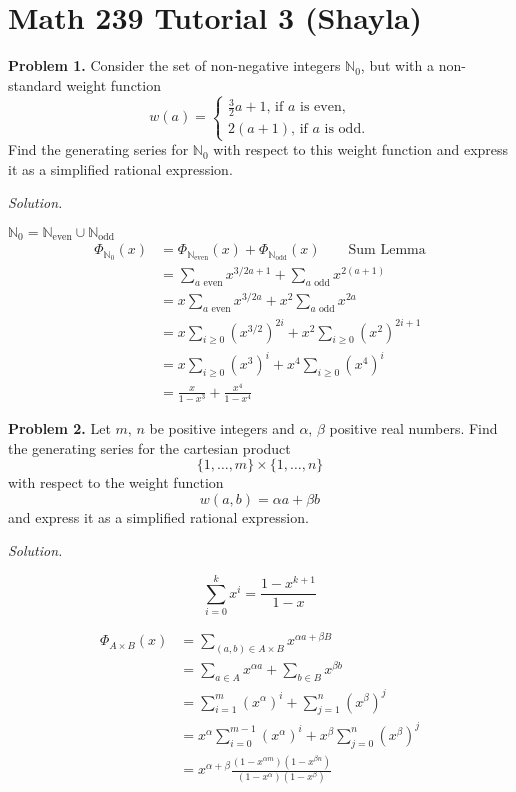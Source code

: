 \section{Math 239 Tutorial 3 (Shayla)}
\textbf{Problem 1.} Consider the set of non-negative integers
$ \mathbb{N}_0 $, but with a non-standard weight function
\[ w(a)=
\begin{cases}
    \frac{3}{2} a + 1,\,\text{if $a$ is even},\\
    2(a+1),\,\text{if $a$ is odd.}
\end{cases} \]
Find the generating series for $ \mathbb{N}_0 $ with respect to this weight
function and express it as a simplified rational expression.

\emph{Solution.}

$ \mathbb{N}_0=\mathbb{N}_{\text{even}}\cup\mathbb{N}_{\text{odd}} $
\begin{align*}
    \Phi_{\mathbb{N}_0}(x)
    &=\Phi_{\mathbb{N}_{\text{even}}}(x)+\Phi_{\mathbb{N}_{\text{odd}}}(x)\qquad\text{Sum Lemma}\\
    &=\sum\limits_{a \text{ even}}x^{3/2a+1}+\sum\limits_{a \text{ odd}}x^{2(a+1)}\\
    &=x \sum\limits_{a \text{ even}}x^{3/2a}+x^2\sum\limits_{a \text{ odd}}x^{2a}\\
    &=x \sum\limits_{i\ge 0} (x^{3/2})^{2i}+x^2\sum\limits_{i \ge 0} (x^{2})^{2i+1}\\
    &=x \sum\limits_{i\ge 0} (x^3)^i + x^4 \sum\limits_{i\ge 0} (x^4)^i\\
    &=\frac{x}{1-x^3} + \frac{x^4}{1-x^4}
\end{align*}

\textbf{Problem 2.} Let $ m,\,n $ be positive integers and $ \alpha,\,\beta $
positive real numbers. Find the generating series for the cartesian product
\[ \{1,\ldots ,m\}\times \{1,\ldots ,n\} \]
with respect to the weight function
\[ w(a,b)=\alpha a+ \beta b \]
and express it as a simplified rational expression.

\emph{Solution.}

\[ \sum\limits_{i=0}^{k} x^i=\frac{1-x^{k+1}}{1-x} \]

\begin{align*}
    \Phi_{A\times B}(x)
    &=\sum\limits_{(a,b)\in A\times B}x^{\alpha a+\beta B}\\
    &=\sum\limits_{a\in A}x^{\alpha a} + \sum\limits_{b\in B}x^{\beta b}\\
    &=\sum\limits_{i=1}^{m} (x^{\alpha})^i+\sum\limits_{j=1}^{n} (x^{\beta})^j\\
    &=x^{\alpha}\sum\limits_{i=0}^{m-1}(x^{\alpha})^i
    +x^{\beta}\sum\limits_{j=0}^{n}(x^{\beta})^j\\
    &=x^{\alpha + \beta}
    \frac{(1-x^{\alpha m})(1-x^{\beta n})}{(1-x^{\alpha})(1-x^{\beta})}
\end{align*}

